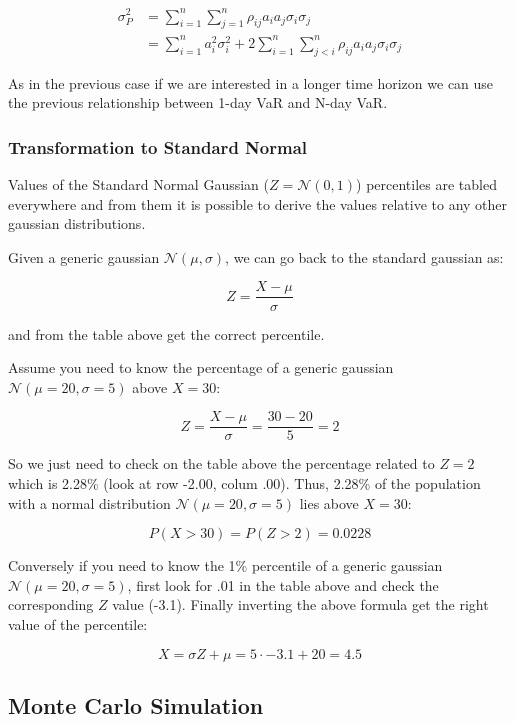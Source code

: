 \begin{align*}\sigma^2_P & = \sum_{i=1}^{n}\sum_{j=1}^{n}\rho_{ij}a_i a_j \sigma_i \sigma_j \\
& = \sum_{i=1}^{n} a_i^2 \sigma_i^2 + 2 \sum_{i=1}^{n}\sum_{j<i}^{n}\rho_{ij}a_i a_j \sigma_i \sigma_j \end{align*}

As in the previous case if we are interested in a longer time horizon we
can use the previous relationship between 1-day VaR and N-day VaR.

\subsubsection{Transformation to Standard
Normal}\label{transformation-to-standard-normal}

Values of the Standard Normal Gaussian (\(Z = \mathcal{N}(0,1)\))
percentiles are tabled everywhere and from them it is possible to
derive the values relative to any other gaussian distributions.

Given a generic gaussian \(\mathcal{N}(\mu , \sigma)\), we can go back
to the standard gaussian as:

\[Z= \frac{X-\mu}{\sigma}\]

and from the table above get the correct percentile.

Assume you need to know the percentage of a generic gaussian
\(\mathcal{N}(\mu=20 ,\sigma=5)\) above \(X=30\):

\[Z=\frac{X-\mu}{\sigma} = \frac{30-20}{5}=2\]

So we just need to check on the table above the percentage related to
\(Z=2\) which is 2.28\% (look at row -2.00, colum .00). Thus, 2.28\% of
the population with a normal distribution
\(\mathcal{N}(\mu=20 ,\sigma=5)\) lies above \(X=30\):

\[P(X>30)=P(Z>2)=0.0228\]

Conversely if you need to know the 1\% percentile of a generic gaussian
\(\mathcal{N}(\mu=20 ,\sigma=5)\), first look for .01 in the table above
and check the corresponding \(Z\) value (-3.1). Finally inverting the
above formula get the right value of the percentile:

\[ X= \sigma Z + \mu = 5\cdot -3.1 + 20 = 4.5 \]

\subsection{Monte Carlo Simulation}\label{monte-carlo-simulation}

